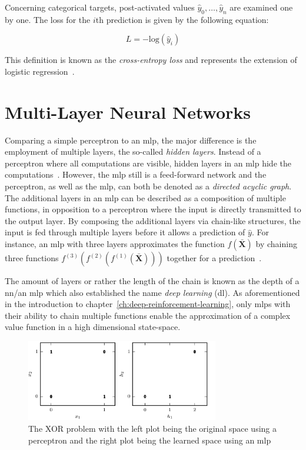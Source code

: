 \documentclass[draft,final]{vutinfth} %
\newcommand{\p}[1]{see p. #1}
\begin{document}
    Concerning categorical targets, post-activated values $\hat{y}_0,\ldots,\hat{y}_n$ are examined one by one.
    The loss for the $i$th prediction is given by the following equation:

    \begin{equation}
        L=-\text{log}(\hat{y}_i)
    \end{equation}

    This definition is known as the \textit{cross-entropy loss} and represents the extension of logistic regression~\citep[\p{15}]{aggarwal_neural_2018}.


    \section{Multi-Layer Neural Networks}
    Comparing a simple perceptron to an \gls{mlp}, the major difference is the employment of multiple layers, the so-called \textit{hidden layers}.
    Instead of a perceptron where all computations are visible, hidden layers in an \gls{mlp} hide the computations~\citep[\p{17}]{aggarwal_neural_2018}.
    However, the \gls{mlp} still is a feed-forward network and the perceptron, as well as the \gls{mlp}, can both be denoted as a \textit{directed acyclic graph}.
    The additional layers in an \gls{mlp} can be described as a composition of multiple functions, in opposition to a perceptron where the input is directly transmitted to the output layer.
    By composing the additional layers via chain-like structures, the input is fed through multiple layers before it allows a prediction of $\hat{y}$.
    For instance, an \gls{mlp} with three layers approximates the function $f(\bar{\boldsymbol{X}})$ by chaining three functions $f^{(3)}(f^{(2)}(f^{(1)}(\bar{\boldsymbol{X}})))$ together for a prediction~\citep[\p{163f}]{goodfellow_deep_2016}.

    The amount of layers or rather the length of the chain is known as the depth of a \gls{nn}/an \gls{mlp} which also established the name \textit{deep learning} (\gls{dl}).
    As aforementioned in the introduction to chapter~\ref{ch:deep-reinforcement-learning}, only \glspl{mlp} with their ability to chain multiple functions enable the approximation of a complex value function in a high dimensional state-space.

    \begin{figure}[h]
        \vspace{0.5cm}
        \centering
        \includegraphics[width=0.75\textwidth]{figures/xor_problem.png}
        \caption[The XOR problem]{The XOR problem with the left plot being the original space using a perceptron and the right plot being the learned space using an \gls{mlp}\protect\footnotemark}
        \label{fig:xor_problem}
    \end{figure}
\end{document}
